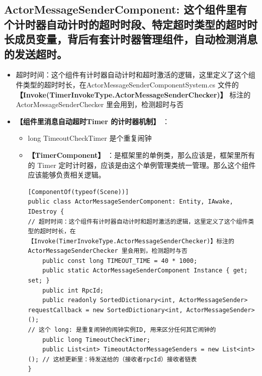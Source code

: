 \documentclass[9pt, b5paper]{article}
\begin{document}
\subsection{ActorMessageSenderComponent: 这个组件里有个计时器自动计时的超时时段、特定超时类型的超时时长成员变量，背后有套计时器管理组件，自动检测消息的发送超时。}
\label{sec-2-2}
\begin{itemize}
\item 超时时间：这个组件有计时器自动计时和超时激活的逻辑，这里定义了这个组件类型的超时时长，在ActorMessageSenderComponentSystem.cs 文件的 \textbf{【Invoke(TimerInvokeType.ActorMessageSenderChecker)】} 标注的ActorMessageSenderChecker 里会用到，检测超时与否
\item \textbf{【组件里消息自动超时Timer 的计时器机制】} ：
\begin{itemize}
\item long TimeoutCheckTimer 是个重复闹钟
\item \textbf{【TimerComponent】} ：是框架里的单例类，那么应该是，框架里所有的 Timer 定时计时器，应该是由这个单例管理类统一管理。那么这个组件应该能够负责相关逻辑。
\begin{verbatim}
[ComponentOf(typeof(Scene))]
public class ActorMessageSenderComponent: Entity, IAwake, IDestroy {
// 超时时间：这个组件有计时器自动计时和超时激活的逻辑，这里定义了这个组件类型的超时时长，在【Invoke(TimerInvokeType.ActorMessageSenderChecker)】标注的ActorMessageSenderChecker 里会用到，检测超时与否
    public const long TIMEOUT_TIME = 40 * 1000;
    public static ActorMessageSenderComponent Instance { get; set; }
    public int RpcId;
    public readonly SortedDictionary<int, ActorMessageSender> requestCallback = new SortedDictionary<int, ActorMessageSender>();
// 这个 long: 是重复闹钟的闹钟实例ID, 用来区分任何其它闹钟的
    public long TimeoutCheckTimer; 
    public List<int> TimeoutActorMessageSenders = new List<int>(); // 这桢更新里：待发送给的（接收者rpcId）接收者链表
}
\end{verbatim}
\end{itemize}
\end{itemize}
\end{document}
